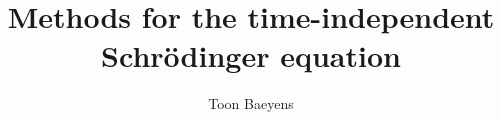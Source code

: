 

\title{Methods for the time-independent Schrödinger equation}
\author{Toon Baeyens}



\maketitle

\cleardoublepage
{}
\tableofcontents









\cleardoublepage

\printbibliography[title=Bibliography,heading=bibintoc]



